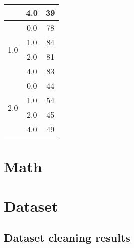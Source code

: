 \begin{longtable}{|c|c|c|c|c|}
    & \multicolumn{2}{c|}{4.0} & \multicolumn{2}{c|}{39} \\
    \hline
    \multirow{4}{*}{1.0} & \multicolumn{2}{c|}{0.0} & \multicolumn{2}{c|}{78} \\
    & \multicolumn{2}{c|}{1.0} & \multicolumn{2}{c|}{84} \\
    & \multicolumn{2}{c|}{2.0} & \multicolumn{2}{c|}{81} \\
    & \multicolumn{2}{c|}{4.0} & \multicolumn{2}{c|}{83} \\
    \hline
    \multirow{4}{*}{2.0} & \multicolumn{2}{c|}{0.0} & \multicolumn{2}{c|}{44} \\
    & \multicolumn{2}{c|}{1.0} & \multicolumn{2}{c|}{54} \\
    & \multicolumn{2}{c|}{2.0} & \multicolumn{2}{c|}{45} \\
    & \multicolumn{2}{c|}{4.0} & \multicolumn{2}{c|}{49} \\
    \hline
    \end{longtable}
    
    
    
    
    
    
    
    
    
    
    
    
    
    
\chapter{Math}

\chapter{Dataset}

    \section{Dataset cleaning results}\label{sec:annexes:dataset_cleaning_results}
